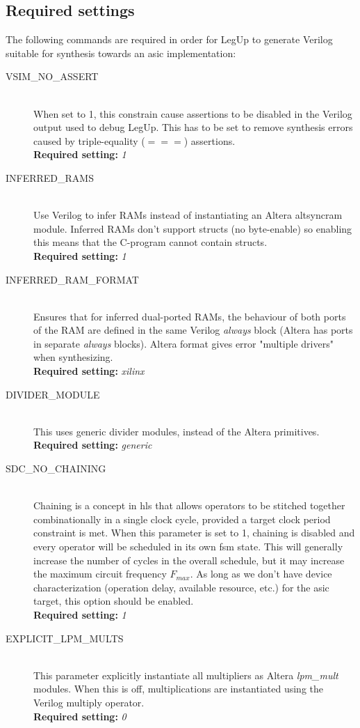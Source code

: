 \subsection{\label{subsec:hlsreqconst}Required settings}
The following commands are required in order for LegUp to generate Verilog suitable for synthesis towards an \gls{asic} implementation:
\begin{description}
  \item[VSIM\_NO\_ASSERT] \hfill \\
      When set to 1, this constrain cause assertions to be disabled in the Verilog output used to debug LegUp. This has to be set to remove synthesis errors caused by triple-equality ($===$) assertions. \hfill \\
      \textbf{Required setting:} \textit{1}
  \item[INFERRED\_RAMS] \hfill \\
      Use Verilog to infer RAMs instead of instantiating an Altera altsyncram module. Inferred RAMs don’t support structs (no byte-enable) so enabling this means that the C-program cannot contain structs. \hfill \\
      \textbf{Required setting:} \textit{1}
  \item[INFERRED\_RAM\_FORMAT] \hfill \\
      Ensures that for inferred dual-ported RAMs, the behaviour of both ports of the RAM are defined in the same Verilog \textit{always} block (Altera has ports in separate \textit{always} blocks). Altera format gives error "multiple drivers" when synthesizing.\hfill \\
      \textbf{Required setting:} \textit{xilinx}
  \item[DIVIDER\_MODULE] \hfill \\
      This uses generic divider modules, instead of the Altera primitives.\hfill \\
      \textbf{Required setting:} \textit{generic}
  \item[SDC\_NO\_CHAINING] \hfill \\
      Chaining is a concept in \gls{hls} that allows operators to be stitched together combinationally in a single clock cycle, provided a target clock period constraint is met. When this parameter is set to 1, chaining is disabled and every operator will be scheduled in its own \gls{fsm} state. This will generally increase the number of cycles in the overall schedule, but it may increase the maximum circuit frequency $F_{max}$. As long as we don't have device characterization (operation delay, available resource, etc.) for the \gls{asic} target, this option should be enabled.\hfill \\
      \textbf{Required setting:} \textit{1}
  \item[EXPLICIT\_LPM\_MULTS] \hfill \\
      This parameter explicitly instantiate all multipliers as Altera \textit{lpm\_mult} modules. When this is off, multiplications are instantiated using the Verilog multiply operator.\hfill \\
      \textbf{Required setting:} \textit{0}
\end{description}
